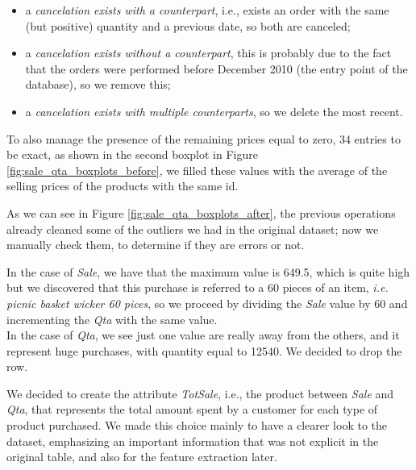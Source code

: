 \begin{itemize}
\item a \emph{cancelation exists with a counterpart}, i.e., exists an order with the same (but positive) quantity and a previous date, so both are canceled;
\item a \emph{cancelation exists without a counterpart}, this is probably due to the fact that the orders were performed before December 2010 (the entry point of the database), so we remove this;
\item a \emph{cancelation exists with multiple counterparts}, so we delete the most recent.
\end{itemize}

To also manage the presence of the remaining prices equal to zero, 34 entries to be exact, as shown in the second boxplot in Figure \ref{fig:sale_qta_boxplots_before}, we filled these values with the average of the selling prices of the products with the same id.

As we can see in Figure \ref{fig:sale_qta_boxplots_after}, the previous operations already cleaned some of the outliers we had in the original dataset; now we manually check them, to determine if they are errors or not.

In the case of \emph{Sale}, we have that the maximum value is 649.5, which is quite high but we discovered that this purchase is referred to a 60 pieces of an item, \emph{i.e. picnic basket wicker 60 pices}, so we proceed by dividing the \emph{Sale} value by 60 and incrementing the \emph{Qta} with the same value.\\
In the case of \emph{Qta}, we see just one value are really away from the others, and it represent huge purchases, with quantity equal to 12540. We decided to drop the row.

We decided to create the attribute \emph{TotSale}, i.e., the product between \emph{Sale} and \emph{Qta}, that represents the total amount spent by a customer for each type of product purchased. We made this choice mainly to have a clearer look to the dataset, emphasizing an important information that was not explicit in the original table, and also for the feature extraction later.

